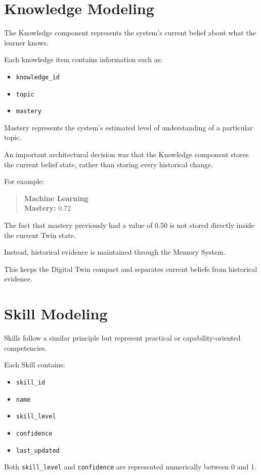 \documentclass[12pt,a4paper]{article}
\begin{document}
\section{Knowledge Modeling}
The Knowledge component represents the system's current belief about what the learner knows.

Each knowledge item contains information such as:
\begin{itemize}[noitemsep,topsep=2pt]
    \item \texttt{knowledge\_id}
    \item \texttt{topic}
    \item \texttt{mastery}
\end{itemize}

Mastery represents the system's estimated level of understanding of a particular topic.

An important architectural decision was that the Knowledge component stores the current belief state, rather than storing every historical change.

For example:
\begin{quote}
\textbf{Machine Learning}\\
\textbf{Mastery:} 0.72
\end{quote}

The fact that mastery previously had a value of 0.50 is not stored directly inside the current Twin state.

Instead, historical evidence is maintained through the Memory System.

This keeps the Digital Twin compact and separates current beliefs from historical evidence.

\section{Skill Modeling}
Skills follow a similar principle but represent practical or capability-oriented competencies.

Each Skill contains:
\begin{itemize}[noitemsep,topsep=2pt]
    \item \texttt{skill\_id}
    \item \texttt{name}
    \item \texttt{skill\_level}
    \item \texttt{confidence}
    \item \texttt{last\_updated}
\end{itemize}

Both \texttt{skill\_level} and \texttt{confidence} are represented numerically between 0 and 1.
\end{document}
